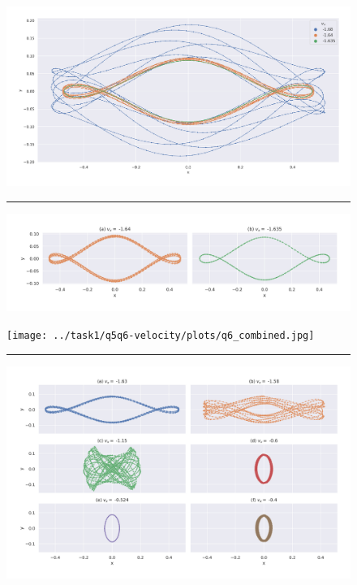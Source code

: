 \documentclass[a4paper]{article}
\begin{document}
		\begin{figure} [h]
			\includegraphics[width=\columnwidth]{../task1/q5q6-velocity/plots/q5_combined.jpg}
			\hrule
			\includegraphics[width=\columnwidth]{../task1/q5q6-velocity/plots/q5_sep.jpg}
			\caption{}
			\label{fig:task1.5}
		\end{figure}
		
		\begin{figure} [h]
			\texttt{[image: ../task1/q5q6-velocity/plots/q6\_combined.jpg]}
			\hrule
			\includegraphics[width=\columnwidth]{../task1/q5q6-velocity/plots/q6_sep.jpg}
			\caption{}
			\label{fig:task1.6}
		\end{figure}
		
	
\end{document}

